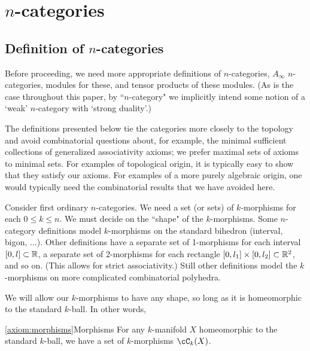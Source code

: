 
\def\xxpar#1#2{\smallskip\noindent{\bf #1} {\it #2} \smallskip}

\section{$n$-categories}
\label{sec:ncats}

\subsection{Definition of $n$-categories}

Before proceeding, we need more appropriate definitions of $n$-categories, 
$A_\infty$ $n$-categories, modules for these, and tensor products of these modules.
(As is the case throughout this paper, by ``$n$-category" we implicitly intend some notion of
a `weak' $n$-category with `strong duality'.)

The definitions presented below tie the categories more closely to the topology
and avoid combinatorial questions about, for example, the minimal sufficient
collections of generalized associativity axioms; we prefer maximal sets of axioms to minimal sets.
For examples of topological origin, it is typically easy to show that they
satisfy our axioms.
For examples of a more purely algebraic origin, one would typically need the combinatorial
results that we have avoided here.

\medskip

Consider first ordinary $n$-categories.
We need a set (or sets) of $k$-morphisms for each $0\le k \le n$.
We must decide on the ``shape" of the $k$-morphisms.
Some $n$-category definitions model $k$-morphisms on the standard bihedron (interval, bigon, ...).
Other definitions have a separate set of 1-morphisms for each interval $[0,l] \subset \mathbb{R}$, 
a separate set of 2-morphisms for each rectangle $[0,l_1]\times [0,l_2] \subset \mathbb{R}^2$,
and so on.
(This allows for strict associativity.)
Still other definitions 
model the $k$-morphisms on more complicated combinatorial polyhedra.

We will allow our $k$-morphisms to have any shape, so long as it is homeomorphic to 
the standard $k$-ball.
In other words,

\begin{preliminary-axiom}{\ref{axiom:morphisms}}{Morphisms}
For any $k$-manifold $X$ homeomorphic 
to the standard $k$-ball, we have a set of $k$-morphisms
$\cC_k(X)$.
\end{preliminary-axiom}

